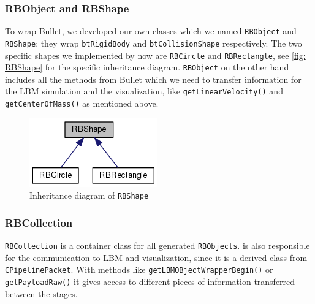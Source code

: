 \subsubsection*{RBObject and RBShape}
To wrap Bullet, we developed our own classes which we named \texttt{RBObject} and \texttt{RBShape}; they wrap \texttt{btRigidBody} and \texttt{btCollisionShape} respectively. The two specific shapes we implemented by now are \texttt{RBCircle} and \texttt{RBRectangle}, see \autoref{fig: RBShape} for the specific inheritance diagram.
\texttt{RBObject} on the other hand includes all the methods from Bullet which we need to transfer information for the LBM simulation and the visualization, like \texttt{getLinearVelocity()} and \texttt{getCenterOfMass()} as mentioned above. 
\begin{figure}[ht]
\centering
\includegraphics[scale=0.5]{img/RigidBodies/RBShapeGraph.png}
\caption{Inheritance diagram of \texttt{RBShape}}
\label{fig: RBShape}
\end{figure}

\subsubsection*{RBCollection}
\texttt{RBCollection} is a container class for all generated \texttt{RBObjects}. is also responsible for the communication to LBM and visualization, since it is a derived class from \texttt{CPipelinePacket}. With methods like \texttt{getLBMOBjectWrapperBegin()} or \texttt{getPayloadRaw()} it gives access to different pieces of information transferred between the stages. 

